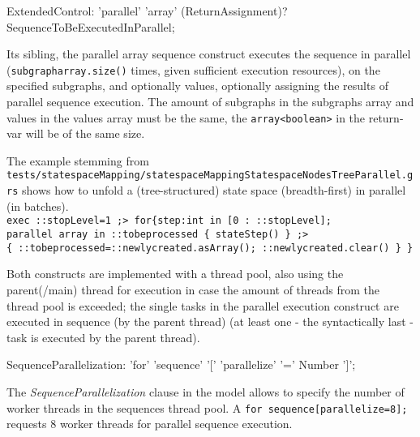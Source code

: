 \begin{rail}
  ExtendedControl: 'parallel' 'array' (ReturnAssignment)? SequenceToBeExecutedInParallel;
\end{rail}

Its sibling, the parallel array sequence construct executes the sequence in parallel (\texttt{subgraph\-array.size()} times, given sufficient execution resources), on the specified subgraphs, and optionally values, optionally assigning the results of parallel sequence execution.
The amount of subgraphs in the subgraphs array and values in the values array must be the same, the \verb#array<boolean># in the return-var will be of the same size.

\begin{example}
The example stemming from \texttt{tests/statespace\-Mapping/statespace\-Mapping\-Statespace\-Nodes\-Tree\-Parallel.grs} shows how to unfold a (tree-structured) state space (breadth-first) in parallel (in batches).\\
\verb#exec ::stopLevel=1 ;> for{step:int in [0 : ::stopLevel];#\\
\verb#parallel array in ::tobeprocessed { stateStep() } ;>#\\
\verb#{ ::tobeprocessed=::newlycreated.asArray(); ::newlycreated.clear() } }#
\end{example}\label{driverstatespace}


Both constructs are implemented with a thread pool, also using the parent(/main) thread for execution
in case the amount of threads from the thread pool is exceeded;
the single tasks in the parallel execution construct are executed in sequence
(by the parent thread) (at least one - the syntactically last - task is executed by the parent thread).

\begin{rail}
  SequenceParallelization: 'for' 'sequence' '[' 'parallelize' '=' Number ']';
\end{rail}

The \emph{SequenceParallelization} clause in the model allows to specify the number of worker threads in the sequences thread pool.
A \verb#for sequence[parallelize=8];# requests 8 worker threads for parallel sequence execution.


